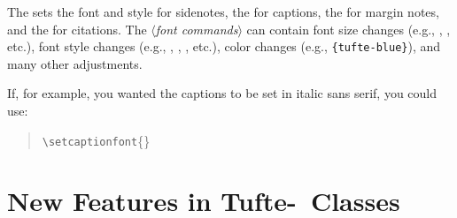 \documentclass[a4paper]{tufte-handout}
\newcommand{\TL}{Tufte-\hologo{LaTeX}\xspace}
\newcommand{\hlorange}[1]{\textcolor{tufte-orange}{#1}}
\newcommand{\doccmd}[1]{\hlorange{\texttt{\textbackslash#1}}}
\newcommand{\docopt}[1]{\( \langle \)\textrm{\textit{#1}}\( \rangle \)}
\newenvironment{docspec}
  {\begin{quotation}\ttfamily\parskip0pt\parindent0pt\ignorespaces}
  {\end{quotation}}
\begin{document}
The  sets the font and style for sidenotes, the  for captions, the  for margin notes, and the  for citations. 
The \docopt{font commands} can contain font size changes (e.g., , , etc.), font style changes (e.g., , , , etc.), color changes (e.g., \texttt{\{tufte-blue\}}), and many other adjustments.

If, for example, you wanted the captions to be set in italic sans serif, you could use:
\begin{docspec}
  \doccmd{setcaptionfont}\{\}
\end{docspec}


\chapter[New Features in Tufte-LaTeX Classes]{New Features in \TL\ Classes}\label{ch:new-features}
\end{document}
